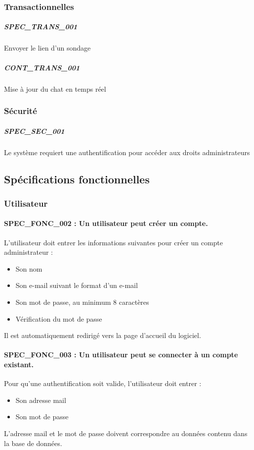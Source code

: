 \documentclass[titlepage]{report}
\begin{document}
\subsubsection{Transactionnelles}
\subparagraph{SPEC\_TRANS\_001} Envoyer le lien d’un sondage
\subparagraph{CONT\_TRANS\_001} Mise à jour du chat en temps réel

\subsubsection{Sécurité}
\subparagraph{SPEC\_SEC\_001} Le système requiert une authentification pour accéder aux droits administrateurs

\subsection{Spécifications fonctionnelles}

\subsubsection{Utilisateur}
\paragraph{SPEC\_FONC\_002 : Un utilisateur peut créer un compte.}
L’utilisateur doit entrer les informations suivantes pour créer un compte administrateur :
\begin{itemize}
\item Son nom
\item Son e-mail suivant le format d’un e-mail
\item Son mot de passe, au minimum 8 caractères
\item Vérification du mot de passe \end{itemize}
Il est automatiquement redirigé vers la page d’accueil du logiciel.

\paragraph{SPEC\_FONC\_003 : Un utilisateur peut se connecter à un compte existant.}
Pour qu’une authentification soit valide, l’utilisateur doit entrer :
\begin{itemize}
\item Son adresse mail
\item Son mot de passe \end{itemize}
L’adresse mail et le mot de passe doivent correspondre au données contenu dans la base de données.
\end{document}
